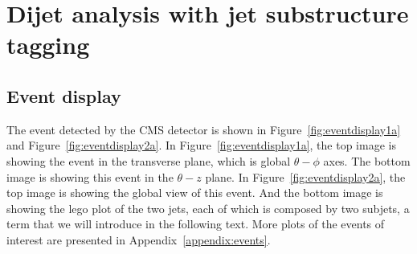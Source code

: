 \section{Dijet analysis with jet substructure tagging}
\label{sec:analysis1}

\subsection{Event display}
The event detected by the CMS detector is shown in Figure~\ref{fig:eventdisplay1a}
and Figure~\ref{fig:eventdisplay2a}. In Figure~\ref{fig:eventdisplay1a}, the top image is
showing the event in the transverse plane, which is global $\theta-\phi$ axes. The bottom
image is showing this event in the $\theta-z$ plane. In Figure~\ref{fig:eventdisplay2a}, the top 
image is showing the global view of this event. And the bottom image is showing
the lego plot of the two jets, each of which is composed by two subjets, a term that we will
introduce in the following text. More plots of the events of interest are presented 
in Appendix~\ref{appendix:events}. 

